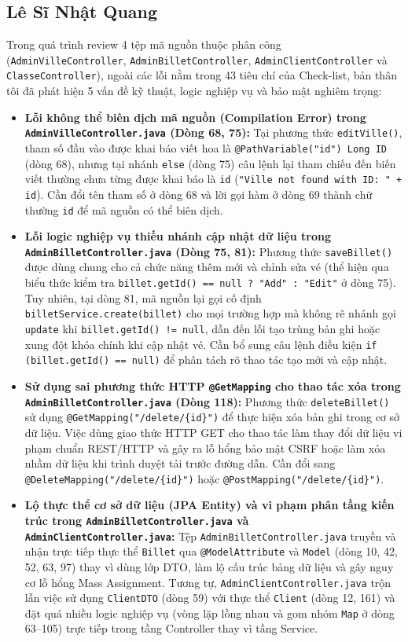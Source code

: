 \documentclass[12pt,a4paper]{article}
\begin{document}
\subsection{Lê Sĩ Nhật Quang}
Trong quá trình review 4 tệp mã nguồn thuộc phân công (\texttt{AdminVilleController}, \texttt{AdminBilletController}, \texttt{AdminClientController} và \texttt{ClasseController}), ngoài các lỗi nằm trong 43 tiêu chí của Check-list, bản thân tôi đã phát hiện 5 vấn đề kỹ thuật, logic nghiệp vụ và bảo mật nghiêm trọng:
\begin{itemize}
  \item \textbf{Lỗi không thể biên dịch mã nguồn (Compilation Error) trong \texttt{AdminVilleController.java} (Dòng 68, 75):} Tại phương thức \texttt{editVille()}, tham số đầu vào được khai báo viết hoa là \texttt{@PathVariable("id") Long ID} (dòng 68), nhưng tại nhánh \texttt{else} (dòng 75) câu lệnh lại tham chiếu đến biến viết thường chưa từng được khai báo là \texttt{id} (\texttt{"Ville not found with ID: " + id}). Cần đổi tên tham số ở dòng 68 và lời gọi hàm ở dòng 69 thành chữ thường \texttt{id} để mã nguồn có thể biên dịch.
  \item \textbf{Lỗi logic nghiệp vụ thiếu nhánh cập nhật dữ liệu trong \texttt{AdminBilletController.java} (Dòng 75, 81):} Phương thức \texttt{saveBillet()} được dùng chung cho cả chức năng thêm mới và chỉnh sửa vé (thể hiện qua biểu thức kiểm tra \texttt{billet.getId() == null ? "Add" : "Edit"} ở dòng 75). Tuy nhiên, tại dòng 81, mã nguồn lại gọi cố định \texttt{billetService.create(billet)} cho mọi trường hợp mà không rẽ nhánh gọi \texttt{update} khi \texttt{billet.getId() != null}, dẫn đến lỗi tạo trùng bản ghi hoặc xung đột khóa chính khi cập nhật vé. Cần bổ sung câu lệnh điều kiện \texttt{if (billet.getId() == null)} để phân tách rõ thao tác tạo mới và cập nhật.
  \item \textbf{Sử dụng sai phương thức HTTP \texttt{@GetMapping} cho thao tác xóa trong \texttt{AdminBilletController.java} (Dòng 118):} Phương thức \texttt{deleteBillet()} sử dụng \texttt{@GetMapping("/delete/\{id\}")} để thực hiện xóa bản ghi trong cơ sở dữ liệu. Việc dùng giao thức HTTP GET cho thao tác làm thay đổi dữ liệu vi phạm chuẩn REST/HTTP và gây ra lỗ hổng bảo mật CSRF hoặc làm xóa nhầm dữ liệu khi trình duyệt tải trước đường dẫn. Cần đổi sang \texttt{@DeleteMapping("/delete/\{id\}")} hoặc \texttt{@PostMapping("/delete/\{id\}")}.
  \item \textbf{Lộ thực thể cơ sở dữ liệu (JPA Entity) và vi phạm phân tầng kiến trúc trong \texttt{AdminBilletController.java} và \texttt{AdminClientController.java}:} Tệp \texttt{AdminBilletController.java} truyền và nhận trực tiếp thực thể \texttt{Billet} qua \texttt{@ModelAttribute} và \texttt{Model} (dòng 10, 42, 52, 63, 97) thay vì dùng lớp DTO, làm lộ cấu trúc bảng dữ liệu và gây nguy cơ lỗ hổng Mass Assignment. Tương tự, \texttt{AdminClientController.java} trộn lẫn việc sử dụng \texttt{ClientDTO} (dòng 59) với thực thể \texttt{Client} (dòng 12, 161) và đặt quá nhiều logic nghiệp vụ (vòng lặp lồng nhau và gom nhóm \texttt{Map} ở dòng 63--105) trực tiếp trong tầng Controller thay vì tầng Service.

\end{itemize}
\end{document}
